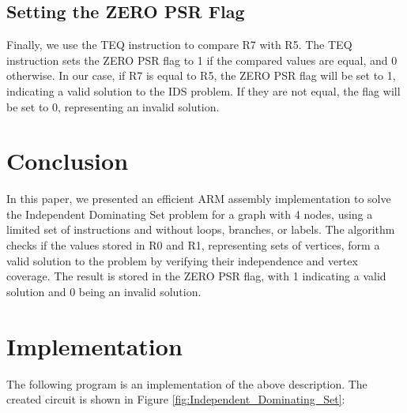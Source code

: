 \subsection{Setting the ZERO PSR Flag}
Finally, we use the TEQ instruction to compare R7 with R5. The TEQ instruction sets the ZERO PSR flag to 1 if the compared values are equal, and 0 otherwise. In our case, if R7 is equal to R5, the ZERO PSR flag will be set to 1, indicating a valid solution to the IDS problem. If they are not equal, the flag will be set to 0, representing an invalid solution.

\section{Conclusion}
In this paper, we presented an efficient ARM assembly implementation to solve the Independent Dominating Set problem for a graph with 4 nodes, using a limited set of instructions and without loops, branches, or labels. The algorithm checks if the values stored in R0 and R1, representing sets of vertices, form a valid solution to the problem by verifying their independence and vertex coverage. The result is stored in the ZERO PSR flag, with 1 indicating a valid solution and 0 being an invalid solution.



\section{Implementation}

The following program is an implementation of the above description. The created circuit is shown in Figure \ref{fig:Independent_Dominating_Set}:

